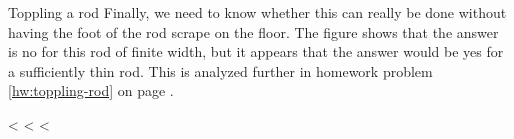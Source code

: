 \begin{eg}{Toppling a rod}
Finally, we need to know whether this can really be done without having the
foot of the rod scrape on the floor. The figure shows that the answer is no
for this rod of finite width, but it appears that the answer would be yes for
a sufficiently thin rod. This is analyzed further in homework problem \ref{hw:toppling-rod}
on page \pageref{hw:toppling-rod}.

\end{eg}

\vfill

<%
<%
<%
